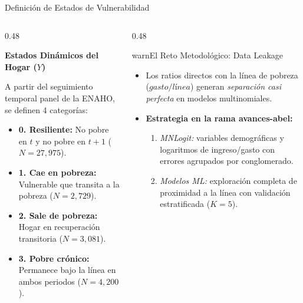 \documentclass[aspectratio=169,11pt,table]{beamer}
\begin{document}
\begin{frame}{Definición de Estados de Vulnerabilidad}
\begin{columns}[T,onlytextwidth]
\begin{column}{0.48\textwidth}
\begin{ccdebox}
\textbf{Estados Dinámicos del Hogar ($Y$)}\par\vspace{0.10cm}
A partir del seguimiento temporal panel de la ENAHO, se definen 4 categorías:
\begin{itemize}
    \item \textbf{0. Resiliente:} No pobre en $t$ y no pobre en $t+1$ ($N=27{,}975$).
    \item \textbf{1. Cae en pobreza:} Vulnerable que transita a la pobreza ($N=2{,}729$).
    \item \textbf{2. Sale de pobreza:} Hogar en recuperación transitoria ($N=3{,}081$).
    \item \textbf{3. Pobre crónico:} Permanece bajo la línea en ambos periodos ($N=4{,}200$).
\end{itemize}
\end{ccdebox}
\end{column}
\begin{column}{0.48\textwidth}
\begin{contrastbox}{warn}{El Reto Metodológico: Data Leakage}
\begin{itemize}
    \item Los ratios directos con la línea de pobreza ($gasto/línea$) generan \textit{separación casi perfecta} en modelos multinomiales.
    \item \textbf{Estrategia en la rama avances-abel:}
    \begin{enumerate}
        \item \textit{MNLogit:} variables demográficas y logaritmos de ingreso/gasto con errores agrupados por conglomerado.
        \item \textit{Modelos ML:} exploración completa de proximidad a la línea con validación estratificada ($K=5$).
    \end{enumerate}
\end{itemize}
\end{contrastbox}
\end{column}
\end{columns}
\end{frame}
\end{document}
